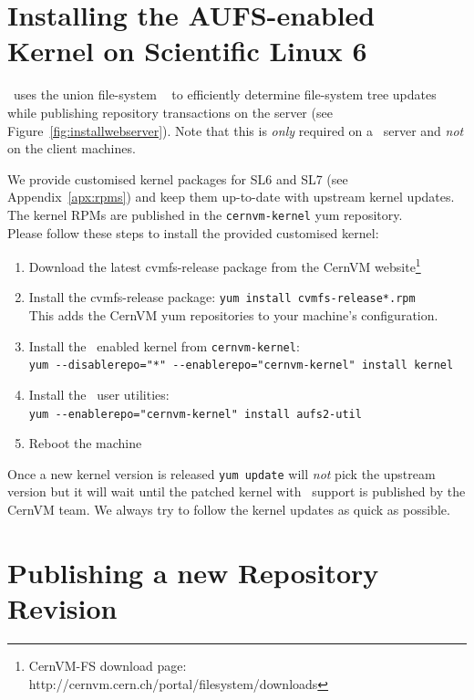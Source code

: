 \pagebreak

\section{Installing the AUFS-enabled Kernel on Scientific Linux 6}
\label{sct:customkernelinstall}
\cvmfs\ uses the union file-system \aufs\ \cite{aufs} to efficiently determine file-system tree updates while publishing repository transactions on the server (see Figure~\ref{fig:installwebserver}).
Note that this is \emph{only} required on a \cvmfs\ server and \emph{not} on the client machines.

We provide customised kernel packages for SL6 and SL7 (see Appendix~\ref{apx:rpms}) and keep them up-to-date with upstream kernel updates.
The kernel RPMs are published in the \texttt{cernvm-kernel} yum repository. \\

\noindent Please follow these steps to install the provided customised kernel:
\begin{enumerate}
\item Download the latest cvmfs-release package from the CernVM website\footnote{CernVM-FS download page: http://cernvm.cern.ch/portal/filesystem/downloads}
\item Install the cvmfs-release package: \texttt{yum install cvmfs-release*.rpm} \\
This adds the CernVM yum repositories to your machine's configuration.
\item Install the \aufs\ enabled kernel from \texttt{cernvm-kernel}: \\
\texttt{yum -\--disablerepo="*" -\--enablerepo="cernvm-kernel" install kernel}
\item Install the \aufs\ user utilities: \\
\texttt{yum -\--enablerepo="cernvm-kernel" install aufs2-util}
\item Reboot the machine
\end{enumerate}

Once a new kernel version is released \texttt{yum update} will \emph{not} pick the upstream version but it will wait until the patched kernel with \aufs\ support is published by the CernVM team.
We always try to follow the kernel updates as quick as possible.

\section{Publishing a new Repository Revision}
\label{sct:repoupdate}

